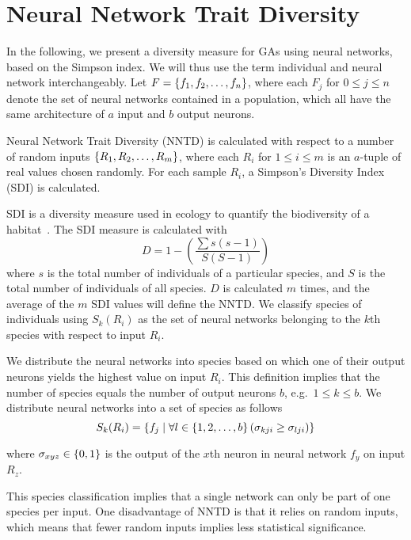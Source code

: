 \section{Neural Network Trait Diversity}
In the following, we present a diversity measure for GAs using neural networks, based on the Simpson index. We will thus use the term individual and neural network interchangeably. Let $F = \left\{ f_1, f_2, \dots, f_n \right\}$, where each $F_j$ for $0 \leq j \leq n$ denote the set of neural networks contained in a population, which all have the same architecture of $a$ input and $b$ output neurons. 

Neural Network Trait Diversity (NNTD) is calculated with respect to a number of random inputs $\left\{ R_1, R_2, \dots, R_m \right\}$, where each $R_i$ for $1 \leq i \leq m$ is an $a$-tuple of real values chosen randomly. For each sample $R_i$, a Simpson's Diversity Index (SDI) is calculated.

SDI is a diversity measure used in ecology to quantify the biodiversity of a habitat~\cite{simpson1949measurement}. The SDI measure is calculated with 
%
\begin{equation*}\label{eq:sdi}
  D = 1 - \left(\frac{\sum{s (s - 1)}}{S (S - 1)}\right) 
\end{equation*}
%
where $s$ is the total number of individuals of a particular species, and $S$ is the total number of individuals of all species. $D$ is calculated $m$ times, and the average of the $m$ SDI values will define the NNTD. We classify species of individuals using $S_k(R_i)$ as the set of neural networks belonging to the $k$th species with respect to input $R_i$.

We distribute the neural networks into species based on which one of their output neurons yields the highest value on input $R_i$. %
This definition implies that the number of species equals the number of output neurons $b$, e.g.\ $1 \leq k \leq b$. We distribute neural networks into a set of species as follows
%
\begin{equation*}\label{eq:species}
  S_k(R_i) = \left\{ f_j \mid \forall l \in \left\{ 1, 2, \dots, b \right\} \left(\sigma_{kji} \geq \sigma_{lji}\right) \right\}
\end{equation*}
%

where $\sigma_{xyz} \in \left\{ 0, 1 \right\}$ is the output of the $x$th neuron in neural network $f_y$ on input $R_z$.

This species classification implies that a single network can only be part of one species per input. One disadvantage of NNTD is that it relies on random inputs, which means that fewer random inputs implies less statistical significance.
